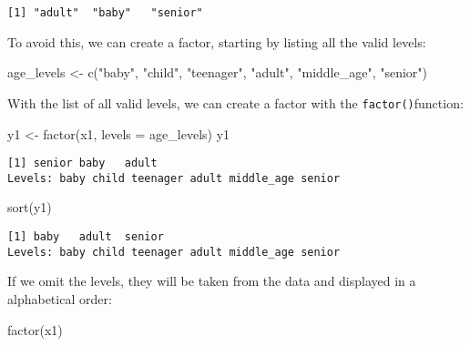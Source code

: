 \documentclass[
]{article}
\newenvironment{Shaded}{\begin{snugshade}}{\end{snugshade}}
\newcommand{\AttributeTok}[1]{\textcolor[rgb]{0.77,0.63,0.00}{#1}}
\newcommand{\FunctionTok}[1]{\textcolor[rgb]{0.00,0.00,0.00}{#1}}
\newcommand{\NormalTok}[1]{#1}
\newcommand{\OtherTok}[1]{\textcolor[rgb]{0.56,0.35,0.01}{#1}}
\newcommand{\StringTok}[1]{\textcolor[rgb]{0.31,0.60,0.02}{#1}}
\begin{document}
\begin{verbatim}
[1] "adult"  "baby"   "senior"
\end{verbatim}

To avoid this, we can create a factor, starting by listing all the valid
levels:

\begin{Shaded}
\begin{Highlighting}[]
\NormalTok{age\_levels }\OtherTok{\textless{}{-}} \FunctionTok{c}\NormalTok{(}\StringTok{"baby"}\NormalTok{, }\StringTok{"child"}\NormalTok{, }\StringTok{"teenager"}\NormalTok{, }\StringTok{"adult"}\NormalTok{, }\StringTok{"middle\_age"}\NormalTok{, }\StringTok{"senior"}\NormalTok{)}
\end{Highlighting}
\end{Shaded}

With the list of all valid levels, we can create a factor with the
\texttt{factor()}function:

\begin{Shaded}
\begin{Highlighting}[]
\NormalTok{y1 }\OtherTok{\textless{}{-}} \FunctionTok{factor}\NormalTok{(x1, }\AttributeTok{levels =}\NormalTok{ age\_levels)}
\NormalTok{y1}
\end{Highlighting}
\end{Shaded}

\begin{verbatim}
[1] senior baby   adult 
Levels: baby child teenager adult middle_age senior
\end{verbatim}

\begin{Shaded}
\begin{Highlighting}[]
\FunctionTok{sort}\NormalTok{(y1)}
\end{Highlighting}
\end{Shaded}

\begin{verbatim}
[1] baby   adult  senior
Levels: baby child teenager adult middle_age senior
\end{verbatim}

If we omit the levels, they will be taken from the data and displayed in
a alphabetical order:

\begin{Shaded}
\begin{Highlighting}[]
\FunctionTok{factor}\NormalTok{(x1)}
\end{Highlighting}
\end{Shaded}
\end{document}
